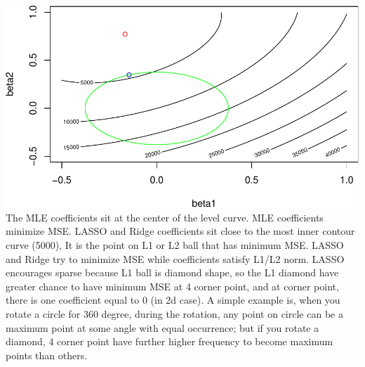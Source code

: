 \documentclass[
]{article}
\newenvironment{Shaded}{\begin{snugshade}}{\end{snugshade}}
\newcommand{\AttributeTok}[1]{\textcolor[rgb]{0.77,0.63,0.00}{#1}}
\newcommand{\CommentTok}[1]{\textcolor[rgb]{0.56,0.35,0.01}{\textit{#1}}}
\newcommand{\ConstantTok}[1]{\textcolor[rgb]{0.00,0.00,0.00}{#1}}
\newcommand{\DecValTok}[1]{\textcolor[rgb]{0.00,0.00,0.81}{#1}}
\newcommand{\FunctionTok}[1]{\textcolor[rgb]{0.00,0.00,0.00}{#1}}
\newcommand{\NormalTok}[1]{#1}
\newcommand{\OtherTok}[1]{\textcolor[rgb]{0.56,0.35,0.01}{#1}}
\newcommand{\SpecialCharTok}[1]{\textcolor[rgb]{0.00,0.00,0.00}{#1}}
\newcommand{\StringTok}[1]{\textcolor[rgb]{0.31,0.60,0.02}{#1}}
\begin{document}
\begin{Shaded}
\end{Shaded}

\includegraphics{HW3_Wu-Yulun_files/figure-latex/unnamed-chunk-8-2.pdf}
The MLE coefficients sit at the center of the level curve. MLE
coefficients minimize MSE. LASSO and Ridge coefficients sit close to the
most inner contour curve (5000), It is the point on L1 or L2 ball that
has minimum MSE. LASSO and Ridge try to minimize MSE while coefficients
satisfy L1/L2 norm. LASSO encourages sparse because L1 ball is diamond
shape, so the L1 diamond have greater chance to have minimum MSE at 4
corner point, and at corner point, there is one coefficient equal to 0
(in 2d case). A simple example is, when you rotate a circle for 360
degree, during the rotation, any point on circle can be a maximum point
at some angle with equal occurrence; but if you rotate a diamond, 4
corner point have further higher frequency to become maximum points than
others.
\end{document}
